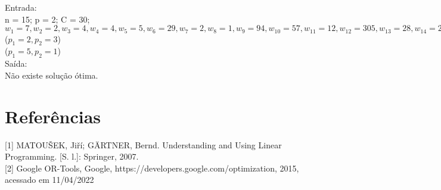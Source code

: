     \noindent Entrada:\\
      \indent n = 15; p = 2; C = 30;\\
      \indent \(w_{1} = 7, w_{2} = 2, w_{3} = 4, w_{4} = 4, w_{5} = 5,
        w_{6} = 29, w_{7} = 2, w_{8} = 1, w_{9} = 94, w_{10} = 57,
        w_{11} = 12, w_{12} = 305, w_{13} = 28, w_{14} = 2, w_{15} = 3\)\\
      \indent (\(p_{1} = 2, p_{2} = 3\))\\
      \indent (\(p_{1} = 5, p_{2} = 1\))\\
    \noindent Saída:\\
       \indent Não existe solução ótima. \\
  
\chapter{Referências}
[1] MATOUŠEK, Jiří; GÄRTNER, Bernd. Understanding and Using Linear
Programming. [S. l.]: Springer, 2007.\\
 

[2] Google OR-Tools, Google, https://developers.google.com/optimization, 2015, acessado em 11/04/2022
